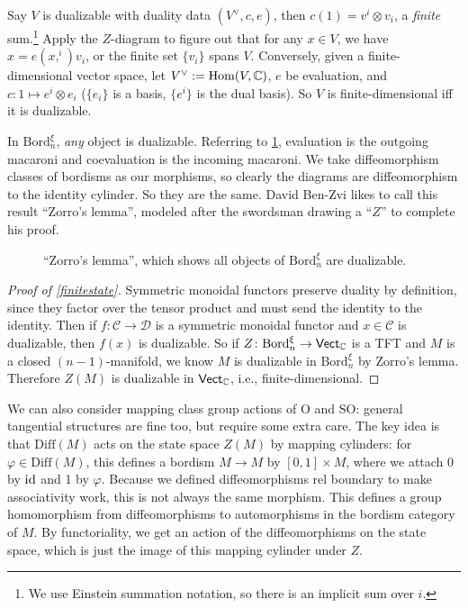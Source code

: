     Say $V$ is dualizable with duality data $(V^{\vee}, c,e)$, then $c(1)=v^i \otimes v_i $, a \emph{finite} sum.\footnote{We use Einstein summation notation, so there is an implicit sum over $i$.} Apply the $Z$-diagram to figure out that for any $x \in V$, we have $x=e(x, ^i )v_i $, or the finite set $\{v_i \} $ spans $V$. Conversely, given a finite-dimensional vector space, let $V^{\vee}:= \operatorname{Hom} (V,\mathbb{C})$, $e$ be evaluation, and $c \colon 1 \mapsto e^i \otimes e_i $ ($\{e_i \} $ is a basis, $\{e^i \} $ is the dual basis). So $V$ is finite-dimensional iff it is dualizable.

    In $\mathrm{Bord}_n ^{\xi}$, \emph{any} object is dualizable. Referring to \cref{zorro}, evaluation is the outgoing macaroni and coevaluation is the incoming macaroni. We take diffeomorphism classes of bordisms as our morphisms, so clearly the diagrams are diffeomorphism to the identity cylinder. So they are the same. David Ben-Zvi likes to call this result ``Zorro's lemma'', modeled after the swordsman drawing a ``$Z$'' to complete his proof. 
    \begin{figure}[H]
    \centering
    \caption{``Zorro's lemma'', which shows all objects of $\mathrm{Bord}_n ^{\xi}$ are dualizable.}
    \label{zorro}
    \end{figure}
\begin{proof}[Proof of \cref{finitestate}]
    Symmetric monoidal functors preserve duality by definition, since they factor over the tensor product and must send the identity to the identity. Then if $f \colon \mathcal{C}  \to \mathcal{D} $ is a symmetric monoidal functor and $x \in \mathcal{C} $ is dualizable, then $f(x)$ is dualizable.
    So if $Z \colon \mathrm{Bord}_n ^{\xi} \to \mathsf{Vect}_{\mathbb{C}} $ is a TFT and $M$ is a closed $(n-1)$-manifold, we know $M$ is dualizable in $\mathrm{Bord}_n ^{\xi}$ by Zorro's lemma. Therefore $Z(M)$ is dualizable in $\mathsf{Vect} _{\mathbb{C}}$, i.e., finite-dimensional.
\end{proof}
We can also consider mapping class group actions of $\mathrm{O}$ and $\mathrm{SO}$: general tangential structures are fine too, but require some extra care. The key idea is that $\mathrm{Diff}(M)$ acts on the state space $Z(M)$ by mapping cylinders: for $\varphi  \in \mathrm{Diff}(M)$, this defines a bordism $M \to M$ by $[0,1] \times M$, where we attach 0 by $\operatorname{id}$ and 1 by $\varphi $. Because we defined diffeomorphisms rel boundary to make associativity work, this is not always the same morphism. This defines a group homomorphism from diffeomorphisms to automorphisms in the bordism category of $M$. By functoriality, we get an action of the diffeomorphisms on the state space, which is just the image of this mapping cylinder under $Z$.

